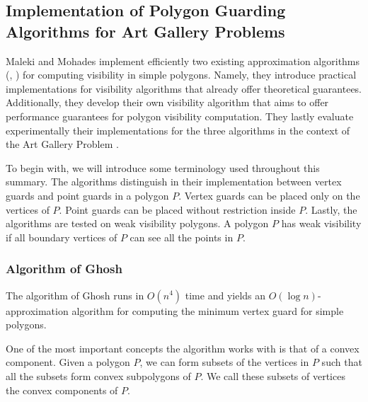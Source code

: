 \subsection[Implementation of Guarding Algorithms]{Implementation of Polygon Guarding Algorithms for Art Gallery Problems}
Maleki and Mohades \cite{maleki2022implementation} implement efficiently two existing approximation algorithms (\cite{GHOSH2010718}, \cite{bhattacharya2016approximability}) for computing visibility in simple polygons. Namely, they introduce practical implementations for visibility algorithms that already offer theoretical guarantees. Additionally, they develop their own visibility algorithm that aims to offer performance guarantees for polygon visibility computation. They lastly  evaluate experimentally their implementations for the three algorithms in the context of the Art Gallery Problem \cite{o1987art}.

To begin with, we will introduce some terminology used throughout this summary. The algorithms distinguish in their implementation between vertex guards and point guards in  a polygon $P$. Vertex guards can be placed only on the vertices of $P$. Point guards can be placed without restriction inside $P$. Lastly, the algorithms are tested on weak visibility polygons. A polygon $P$ has weak visibility if all boundary vertices of $P$ can see all the points in $P$.


\subsubsection{Algorithm of Ghosh}
The algorithm of Ghosh \cite{GHOSH2010718} runs in $O(n^4)$ time and yields an $O(\log n)$-approximation algorithm for computing the minimum vertex guard for simple polygons. 

One of the most important concepts the algorithm works with is that of a convex component. Given a polygon $P$, we can form subsets of the vertices in $P$ such that all the subsets form convex subpolygons of $P$. We call these subsets of vertices the convex components of $P$.

